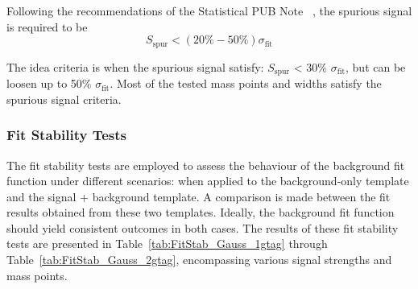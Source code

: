 %

Following the recommendations of the Statistical PUB Note~\cite{ATL-PHYS-PUB-2020-028}
, the spurious signal is required to be
\begin{equation}
 S_\mathrm{spur} < (20\% - 50\%)\sigma_\mathrm{fit}
\end{equation}

The idea criteria is when the spurious signal satisfy: $S_\mathrm{spur}$ < 30\% $\sigma_\mathrm{fit}$, but can be loosen up to 50\% $\sigma_\mathrm{fit}$. Most of the tested mass points and widths satisfy the spurious signal criteria. 

\FloatBarrier

\subsubsection{Fit Stability Tests}
The fit stability tests are employed to assess the behaviour of the background fit function under different scenarios: when applied to the background-only template and the signal + background template. A comparison is made between the fit results obtained from these two templates. Ideally, the background fit function should yield consistent outcomes in both cases. The results of these fit stability tests are presented in Table~\ref{tab:FitStab_Gauss_1gtag} through Table~\ref{tab:FitStab_Gauss_2gtag}, encompassing various signal strengths and mass points.


